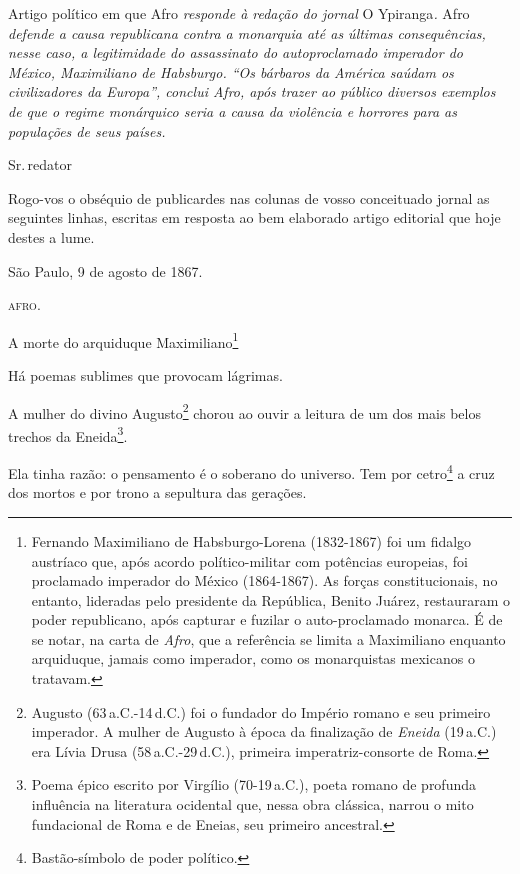 \begin{didascalia}
Artigo político em que Afro \emph{responde à redação do jornal} O
Ypiranga\emph{.} Afro \emph{defende a causa republicana contra a
monarquia até as últimas consequências, nesse caso, a legitimidade do
assassinato do autoproclamado imperador do México, Maximiliano de
Habsburgo. ``Os bárbaros da América saúdam os civilizadores da Europa'',
conclui Afro, após trazer ao público diversos exemplos de que o regime
monárquico seria a causa da violência e horrores para as populações de
seus países.}
\end{didascalia}



Sr.\,redator

Rogo-vos o obséquio de publicardes nas colunas de vosso conceituado
jornal as seguintes linhas, escritas em resposta ao bem elaborado artigo
editorial que hoje destes a lume.
\begin{flushright}
São Paulo, 9 de agosto de 1867.

\textsc{afro}.
\end{flushright}
A morte do arquiduque Maximiliano\footnote{Fernando Maximiliano de
  Habsburgo-Lorena (1832-1867) foi um fidalgo austríaco que, após acordo
  político-militar com potências europeias, foi proclamado imperador do
  México (1864-1867). As forças constitucionais, no entanto, lideradas
  pelo presidente da República, Benito Juárez, restauraram o poder
  republicano, após capturar e fuzilar o auto-proclamado monarca. É de
  se notar, na carta de \emph{Afro}, que a referência se limita a
  Maximiliano enquanto arquiduque, jamais como imperador, como os
  monarquistas mexicanos o tratavam.}

Há poemas sublimes que provocam lágrimas.

A mulher do divino Augusto\footnote{Augusto (63\,a.C.-14\,d.C.) foi o
  fundador do Império romano e seu primeiro imperador. A mulher de
  Augusto à época da finalização de \emph{Eneida} (19\,a.C.) era Lívia
  Drusa (58\,a.C.-29\,d.C.), primeira imperatriz-consorte de Roma.} chorou
ao ouvir a leitura de um dos mais belos trechos da Eneida\footnote{
  Poema épico escrito por Virgílio (70-19\,a.C.), poeta romano de
  profunda influência na literatura ocidental que, nessa obra clássica,
  narrou o mito fundacional de Roma e de Eneias, seu primeiro ancestral.}.

Ela tinha razão: o pensamento é o soberano do universo. Tem por
cetro\footnote{Bastão-símbolo de poder político.} a cruz dos mortos e
por trono a sepultura das gerações.

